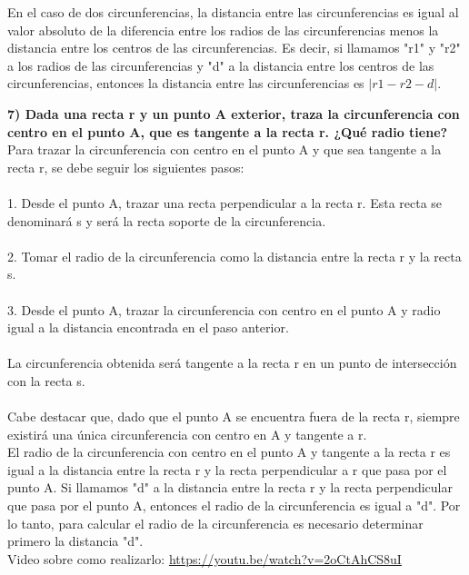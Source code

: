 \documentclass{article}
\begin{document}
En el caso de dos circunferencias, la distancia entre las circunferencias es igual al valor absoluto de la diferencia entre los radios de las circunferencias menos la distancia entre los centros de
las circunferencias. Es decir, si llamamos "r1" y "r2" a los radios de las circunferencias y "d" a la distancia entre los centros de las circunferencias, entonces la distancia entre las circunferencias es $|r1 - r2 - d|$.

{\bf 7) Dada una recta r y un punto A exterior, traza la circunferencia con centro en el punto A, que es tangente a la recta r. ¿Qué radio tiene? } \\

Para trazar la circunferencia con centro en el punto A y que sea tangente a la recta r, se debe seguir los siguientes pasos: \\
 \\
1. Desde el punto A, trazar una recta perpendicular a la recta r. Esta recta se denominará s y será la recta soporte de la circunferencia. \\
 \\
2. Tomar el radio de la circunferencia como la distancia entre la recta r y la recta s. \\
 \\
3. Desde el punto A, trazar la circunferencia con centro en el punto A y radio igual a la distancia encontrada en el paso anterior. \\
 \\
La circunferencia obtenida será tangente a la recta r en un punto de intersección con la recta s. \\
 \\
Cabe destacar que, dado que el punto A se encuentra fuera de la recta r, siempre existirá una única circunferencia con centro en A y tangente a r. \\


El radio de la circunferencia con centro en el punto A y tangente a la recta r es igual a la distancia entre la recta r y la recta perpendicular a r que pasa por el punto A. Si llamamos "d" a la distancia entre la recta r y la recta perpendicular que pasa por el punto A, entonces el radio de la circunferencia es igual a "d". Por lo tanto, para calcular el radio de la circunferencia es necesario determinar primero la distancia "d". \\

Video sobre como realizarlo: \href{https://youtu.be/watch?v=2oCtAhCS8uI}{https://youtu.be/watch?v=2oCtAhCS8uI}
\end{document}
